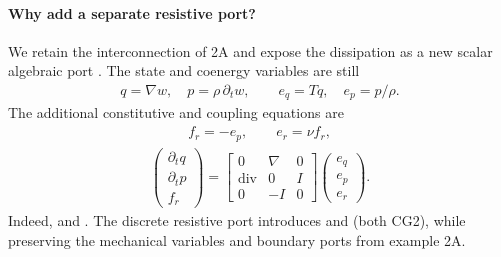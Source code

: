 \documentclass[letterpaper,10pt,english]{sphinxmanual}
\begin{document}
\paragraph{Why add a separate resistive port?}
\label{\detokenize{examples/wave:why-add-a-separate-resistive-port}}
\sphinxAtStartPar
We retain the  interconnection of 2A and
expose the dissipation as a new scalar algebraic port
. The state and co\sphinxhyphen{}energy variables are still
\begin{equation*}
\begin{split}q=\nabla w,\quad p=\rho\,\partial_t w,\qquad
e_q=Tq,\quad e_p=p/\rho.\end{split}
\end{equation*}
\sphinxAtStartPar
The additional constitutive and coupling equations are
\begin{equation*}
\begin{split}f_r=-e_p,\qquad e_r=\nu f_r,\end{split}
\end{equation*}\begin{equation*}
\begin{split}\begin{pmatrix}\partial_t q\\ \partial_t p\\ f_r\end{pmatrix}
=
\begin{bmatrix}
0&\nabla&0\\
\operatorname{div}&0&I\\
0&-I&0
\end{bmatrix}
\begin{pmatrix}e_q\\e_p\\e_r\end{pmatrix}.\end{split}
\end{equation*}
\sphinxAtStartPar
Indeed,  and
.
The discrete resistive port introduces   and  (both CG2), while
preserving the mechanical variables and boundary ports
from example 2A.
\end{document}
